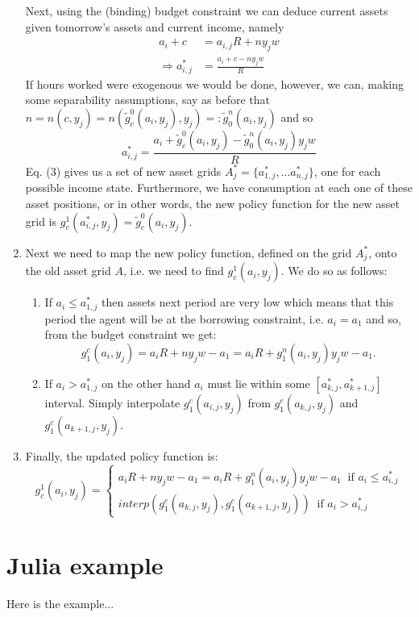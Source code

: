 \documentclass[11pt]{article}
\theoremstyle{definition}
\begin{document}
\begin{enumerate}
	Next, using the (binding) budget constraint we can deduce current assets given tomorrow's assets and current income, namely
	\begin{align*}
	a_{i} + c &= a_{i,j} R + ny_{j}w\\
	\Rightarrow a_{i,j}^{\ast}&=\frac{a_{i}+c-ny_{j}w}{R}
	\end{align*}
	If hours worked were exogenous we would be done, however, we can, making some separability assumptions, say as before that $n=n(c,y_{j})=n(\tilde{g}_{c}^{0}(a_{i},y_{j}),y_{j})=:\tilde{g}_{0}^{n}(a_{i},y_{j})$ and so
	\begin{equation}
	a_{i,j}^{\ast}=\frac{a_{i}+\tilde{g}_{c}^{0}(a_{i},y_{j})-\tilde{g}_{0}^{n}(a_{i},y_{j})y_{j}w}{R}
	\end{equation}
	Eq. (3) gives us a set of new asset grids $A^{\ast}_{j}=\{a_{1,j}^{\ast},\dots a_{n,j}^{\ast}\}$, one for each possible income state. Furthermore, we have consumption at each one of these asset positions, or in other words, the new policy function for the new asset grid is $g_{c}^{1}(a_{i,j}^{\ast},y_{j})=\tilde{g}_{c}^{0}(a_{i},y_{j})$.
	\item  Next we need to map the new policy function, defined on the grid $A_{j}^{\ast}$, onto the old asset grid $A$, i.e. we need to find $g_{c}^{1}(a_{i},y_{j})$. We do so as follows:
	\begin{enumerate}
		\item If $a_{i}\leq a_{1,j}^{\ast}$ then assets next period are very low which means that this period the agent will be at the borrowing constraint, i.e. $a_{i}=a_{1}$ and so, from the budget constraint we get:
		$$g_{1}^{c}(a_{i},y_{j})=a_{i}R+ny_{j}w-a_{1}=a_{i}R+g_{1}^{n}(a_{i},y_{j})y_{j}w-a_{1}.$$
		\item If $a_{i}>a_{1,j}^{\ast}$ on the other hand $a_{i}$ must lie within some $\left[a_{k,j}^{\ast},a_{k+1,j}^{\ast}\right]$ interval. Simply interpolate $g_{1}^{c}(a_{i,j},y_{j})$ from $g_{1}^{c}(a_{k,j},y_{j})$ and $g_{1}^{c}(a_{k+1,j},y_{j})$.
	\end{enumerate}
	\item Finally, the updated policy function is:
	\begin{equation}
	g_{c}^{1}(a_{i},y_{j})=\begin{cases}
	a_{i}R+ny_{j}w-a_{1}=a_{i}R+g_{1}^{n}(a_{i},y_{j})y_{j}w-a_{1} \;\; \text{if } a_{i}\leq a_{i,j}^{\ast}\\
	interp\left(g_{1}^{c}(a_{k,j},y_{j}),g_{1}^{c}(a_{k+1,j},y_{j})\right) \;\; \text{if } a_{i}> a_{i,j}^{\ast}
	\end{cases}
	\end{equation}
\end{enumerate}


\section{Julia example}
\begin{shaded}
Here is the example...
\end{shaded}
\end{document}
